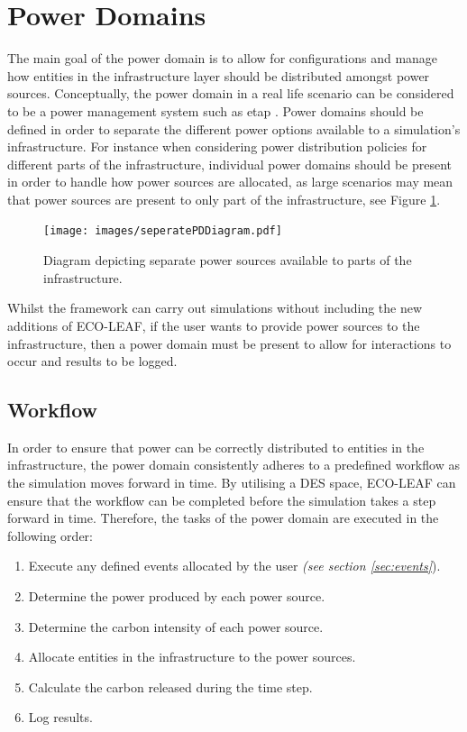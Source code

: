 \documentclass{l4proj}
\begin{document}
\section{Power Domains}\label{sec:power-domains}
The main goal of the power domain is to allow for configurations and manage how entities in the infrastructure layer should be distributed amongst power sources.
Conceptually, the power domain in a real life scenario can be considered to be a power management system such as etap \citep{etap}.
Power domains should be defined in order to separate the different power options available to a simulation's infrastructure.
For instance when considering power distribution policies for different parts of the infrastructure, individual power domains should be present in order to handle how power sources are allocated, as large scenarios may mean that power sources are present to only part of the infrastructure, see Figure \ref{fig:seperatePDs}.
\begin{figure}[htbp]
    \centering
    \texttt{[image: images/seperatePDDiagram.pdf]}
    ~
    \caption{Diagram depicting separate power sources available to parts of the infrastructure.}
    \label{fig:seperatePDs}
\end{figure}

Whilst the framework can carry out simulations without including the new additions of ECO-LEAF, if the user wants to provide power sources to the infrastructure, then a power domain must be present to allow for interactions to occur and results to be logged.

\subsection{Workflow}\label{subsec:power-domain-workflow}
In order to ensure that power can be correctly distributed to entities in the infrastructure, the power domain consistently adheres to a predefined workflow as the simulation moves forward in time.
By utilising a DES space, ECO-LEAF can ensure that the workflow can be completed before the simulation takes a step forward in time.
Therefore, the tasks of the power domain are executed in the following order:
\begin{enumerate}
    \item Execute any defined events allocated by the user \emph{(see section \ref{sec:events}}).
    \item Determine the power produced by each power source.
    \item Determine the carbon intensity of each power source.
    \item Allocate entities in the infrastructure to the power sources.
    \item Calculate the carbon released during the time step.
    \item Log results.
\end{enumerate}
\end{document}
